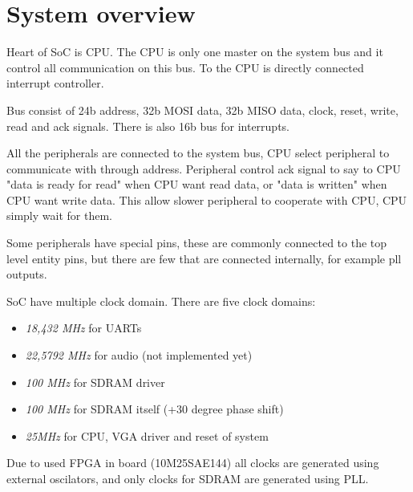 \section{System overview}

Heart of SoC is CPU. The CPU is only one master on the system bus and it control
all communication on this bus. To the CPU is directly connected interrupt
controller.

Bus consist of 24b address, 32b MOSI data, 32b MISO data, clock, reset, write,
read and ack signals. There is also 16b bus for interrupts.

All the peripherals are connected to the system bus, CPU select peripheral to
communicate with through address. Peripheral control ack signal to say to CPU
"data is ready for read" when CPU want read data, or "data is written" when CPU
want write data. This allow slower peripheral to cooperate with CPU, CPU simply
wait for them.

Some peripherals have special pins, these are commonly connected to the top
level entity pins, but there are few that are connected internally, for example
pll outputs.

SoC have multiple clock domain. There are five clock domains:

\begin{itemize}
	\item \textit{18,432 MHz} for UARTs
	\item \textit{22,5792 MHz} for audio (not implemented yet)
	\item \textit{100 MHz} for SDRAM driver
	\item \textit{100 MHz} for SDRAM itself (+30 degree phase shift)	
	\item \textit{25MHz} for CPU, VGA driver and reset of system
\end{itemize}

Due to used FPGA in board (10M25SAE144) all clocks are generated using 
external oscilators, and only clocks for SDRAM are generated using PLL.

